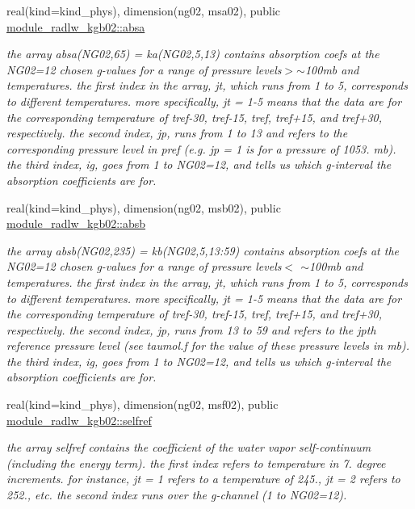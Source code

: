 \begin{DoxyCompactItemize}
real(kind=kind\+\_\+phys), dimension(ng02, msa02), public \hyperlink{group__module__radlw__kgbnn_ga46db893d4456b2d867130bb208cb2206}{module\+\_\+radlw\+\_\+kgb02\+::absa}
\begin{DoxyCompactList}\small\item\em the array absa(\+N\+G02,65) = ka(\+N\+G02,5,13) contains absorption coefs at the N\+G02=12 chosen g-\/values for a range of pressure levels$>$$\sim$100mb and temperatures. the first index in the array, jt, which runs from 1 to 5, corresponds to different temperatures. more specifically, jt = 1-\/5 means that the data are for the corresponding temperature of tref-\/30, tref-\/15, tref, tref+15, and tref+30, respectively. the second index, jp, runs from 1 to 13 and refers to the corresponding pressure level in pref (e.\+g. jp = 1 is for a pressure of 1053. mb). the third index, ig, goes from 1 to N\+G02=12, and tells us which g-\/interval the absorption coefficients are for. \end{DoxyCompactList}\item 
real(kind=kind\+\_\+phys), dimension(ng02, msb02), public \hyperlink{group__module__radlw__kgbnn_gacf34f9255586c9ed5ac5370db5b63c14}{module\+\_\+radlw\+\_\+kgb02\+::absb}
\begin{DoxyCompactList}\small\item\em the array absb(\+N\+G02,235) = kb(\+N\+G02,5,13\+:59) contains absorption coefs at the N\+G02=12 chosen g-\/values for a range of pressure levels$<$ $\sim$100mb and temperatures. the first index in the array, jt, which runs from 1 to 5, corresponds to different temperatures. more specifically, jt = 1-\/5 means that the data are for the corresponding temperature of tref-\/30, tref-\/15, tref, tref+15, and tref+30, respectively. the second index, jp, runs from 13 to 59 and refers to the jpth reference pressure level (see taumol.\+f for the value of these pressure levels in mb). the third index, ig, goes from 1 to N\+G02=12, and tells us which g-\/interval the absorption coefficients are for. \end{DoxyCompactList}\item 
real(kind=kind\+\_\+phys), dimension(ng02, msf02), public \hyperlink{group__module__radlw__kgbnn_gaddb071e93b4ff49ba1f1c4d102e275f1}{module\+\_\+radlw\+\_\+kgb02\+::selfref}
\begin{DoxyCompactList}\small\item\em the array selfref contains the coefficient of the water vapor self-\/continuum (including the energy term). the first index refers to temperature in 7. degree increments. for instance, jt = 1 refers to a temperature of 245., jt = 2 refers to 252., etc. the second index runs over the g-\/channel (1 to N\+G02=12). \end{DoxyCompactList}\item 

\end{DoxyCompactItemize}
